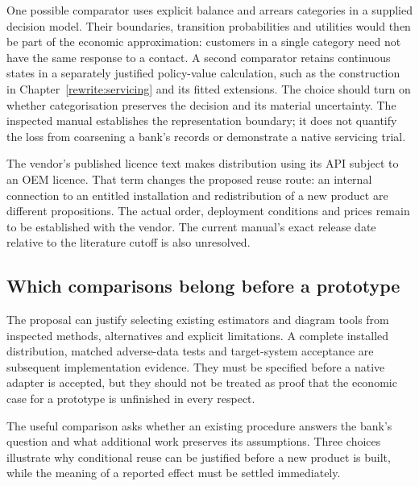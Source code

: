 One possible comparator uses explicit balance and arrears categories in a
supplied decision model. Their boundaries, transition probabilities and
utilities would then be part of the economic approximation: customers in a
single category need not have the same response to a contact. A second
comparator retains continuous states in a separately justified policy-value
calculation, such as the construction in Chapter~\ref{rewrite:servicing} and
its fitted extensions. The choice should turn on whether categorisation
preserves the decision and its material uncertainty. The inspected manual
establishes the representation boundary; it does not quantify the loss from
coarsening a bank's records or demonstrate a native servicing trial.

The vendor's published licence text makes distribution using its API subject
to an OEM licence. That term changes the proposed reuse route: an internal
connection to an entitled installation and redistribution of a new product
are different propositions. The actual order, deployment conditions and
prices remain to be established with the vendor. The current manual's exact
release date relative to the literature cutoff is also unresolved.
\citep{gap29huginlicense}

\subsection{Which comparisons belong before a prototype}
The proposal can justify selecting existing estimators and diagram tools
from inspected methods, alternatives and explicit limitations. A complete
installed distribution, matched adverse-data tests and target-system
acceptance are subsequent implementation evidence. They must be specified
before a native adapter is accepted, but they should not be treated as
proof that the economic case for a prototype is unfinished in every respect.

The useful comparison asks whether an existing procedure answers the bank's
question and what additional work preserves its assumptions. Three choices
illustrate why conditional reuse can be justified before a new product is
built, while the meaning of a reported effect must be settled immediately.

